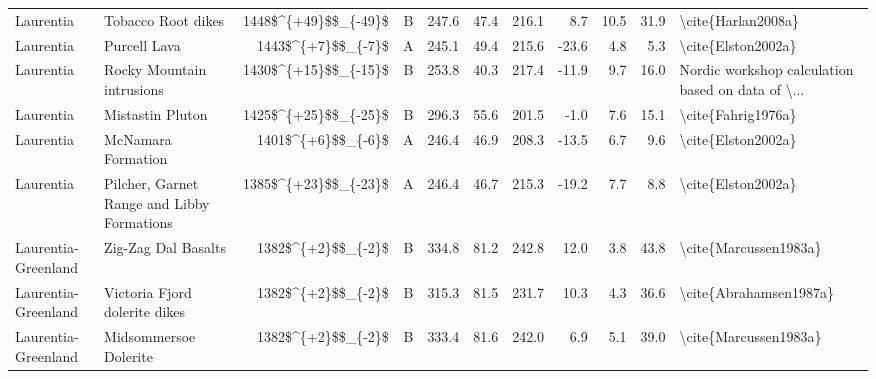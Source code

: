 \begin{longtable}{p{1 in}p{1 in}rrrrrrrr}
                     Laurentia &                                 Tobacco Root dikes &   1448\$\textasciicircum \{+49\}\$\$\_\{-49\}\$ &      B &     247.6 &      47.4 & 216.1 &   8.7 &      10.5 &        31.9 &                                 \textbackslash cite\{Harlan2008a\} \\
                     Laurentia &                                       Purcell Lava &     1443\$\textasciicircum \{+7\}\$\$\_\{-7\}\$ &      A &     245.1 &      49.4 & 215.6 & -23.6 &       4.8 &         5.3 &                                 \textbackslash cite\{Elston2002a\} \\
                     Laurentia &                          Rocky Mountain intrusions &   1430\$\textasciicircum \{+15\}\$\$\_\{-15\}\$ &      B &     253.8 &      40.3 & 217.4 & -11.9 &       9.7 &        16.0 &  Nordic workshop calculation based on data of \textbackslash ... \\
                     Laurentia &                                   Mistastin Pluton &   1425\$\textasciicircum \{+25\}\$\$\_\{-25\}\$ &      B &     296.3 &      55.6 & 201.5 &  -1.0 &       7.6 &        15.1 &                                 \textbackslash cite\{Fahrig1976a\} \\
                     Laurentia &                                 McNamara Formation &     1401\$\textasciicircum \{+6\}\$\$\_\{-6\}\$ &      A &     246.4 &      46.9 & 208.3 & -13.5 &       6.7 &         9.6 &                                 \textbackslash cite\{Elston2002a\} \\
                     Laurentia &         Pilcher, Garnet Range and Libby Formations &   1385\$\textasciicircum \{+23\}\$\$\_\{-23\}\$ &      A &     246.4 &      46.7 & 215.3 & -19.2 &       7.7 &         8.8 &                                 \textbackslash cite\{Elston2002a\} \\
           Laurentia-Greenland &                                Zig-Zag Dal Basalts &     1382\$\textasciicircum \{+2\}\$\$\_\{-2\}\$ &      B &     334.8 &      81.2 & 242.8 &  12.0 &       3.8 &        43.8 &                              \textbackslash cite\{Marcussen1983a\} \\
           Laurentia-Greenland &                      Victoria Fjord dolerite dikes &     1382\$\textasciicircum \{+2\}\$\$\_\{-2\}\$ &      B &     315.3 &      81.5 & 231.7 &  10.3 &       4.3 &        36.6 &                             \textbackslash cite\{Abrahamsen1987a\} \\
           Laurentia-Greenland &                              Midsommersoe Dolerite &     1382\$\textasciicircum \{+2\}\$\$\_\{-2\}\$ &      B &     333.4 &      81.6 & 242.0 &   6.9 &       5.1 &        39.0 &                              \textbackslash cite\{Marcussen1983a\} \\

\end{longtable}
